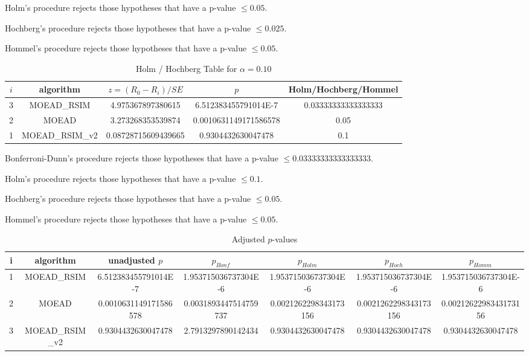 \documentclass[a4paper,10pt]{article}
\begin{document}
\begin{landscape}
Holm's procedure rejects those hypotheses that have a p-value $\le0.05$.


Hochberg's procedure rejects those hypotheses that have a p-value $\le0.025$.


Hommel's procedure rejects those hypotheses that have a p-value $\le0.05$.


\begin{table}[!htp]
\centering\tiny
\caption{Holm / Hochberg Table for $\alpha=0.10$}
\begin{tabular}{ccccc}
$i$&algorithm&$z=(R_0 - R_i)/SE$&$p$&Holm/Hochberg/Hommel\\
\hline
3&MOEAD_RSIM&4.975367897380615&6.512383455791014E-7&0.03333333333333333\\
2&MOEAD&3.273268353539874&0.0010631149171586578&0.05\\
1&MOEAD_RSIM_v2&0.08728715609439665&0.9304432630047478&0.1\\
\hline
\end{tabular}
\end{table}
Bonferroni-Dunn's procedure rejects those hypotheses that have a p-value $\le0.03333333333333333$.


Holm's procedure rejects those hypotheses that have a p-value $\le0.1$.


Hochberg's procedure rejects those hypotheses that have a p-value $\le0.05$.


Hommel's procedure rejects those hypotheses that have a p-value $\le0.05$.


\begin{table}[!htp]
\centering\tiny
\caption{Adjusted $p$-values}
\begin{tabular}{ccccccc}
i&algorithm&unadjusted $p$&$p_{Bonf}$&$p_{Holm}$&$p_{Hoch}$&$p_{Homm}$\\
\hline
1&MOEAD_RSIM&6.512383455791014E-7&1.953715036737304E-6&1.953715036737304E-6&1.953715036737304E-6&1.953715036737304E-6\\
2&MOEAD&0.0010631149171586578&0.0031893447514759737&0.0021262298343173156&0.0021262298343173156&0.0021262298343173156\\
3&MOEAD_RSIM_v2&0.9304432630047478&2.7913297890142434&0.9304432630047478&0.9304432630047478&0.9304432630047478\\
\hline
\end{tabular}
\end{table}


\end{landscape}
\end{document}
